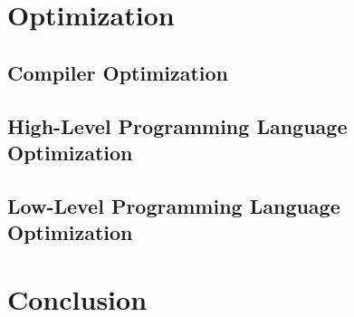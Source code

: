 \documentclass[sigconf, review=false]{acmart}
\begin{document}
\section{Optimization}
\subsection{Compiler Optimization}

\subsection{High-Level Programming Language Optimization}

\subsection{Low-Level Programming Language Optimization}



\section{Conclusion}





\end{document}
